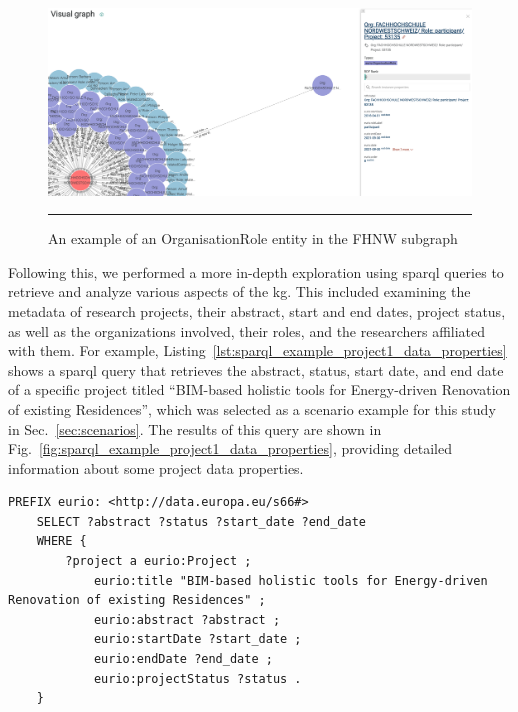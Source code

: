 \begin{figure}[htbp]
    \centering
 \includegraphics[width=.9\textwidth]{figures/architecture/graphdb-fhnw-organisationRole-example.png}
     \rule{35em}{0.5pt}
    \caption{An example of an OrganisationRole entity in the FHNW subgraph}
 \label{fig:fhnw-organisationRole-example}
\end{figure}

Following this, we performed a more in-depth exploration using \gls{sparql} queries to retrieve and analyze various aspects of the \gls{kg}.
This included examining the metadata of research projects, their abstract, start and end dates, project status, as well as the organizations involved, their roles, and the researchers affiliated with them.
For example, Listing~\ref{lst:sparql_example_project1_data_properties} shows a \gls{sparql} query that retrieves the abstract, status, start date, and end date of a specific project titled ``BIM-based holistic tools for Energy-driven Renovation of existing Residences'', which was selected as a scenario example for this study in Sec.~\ref{sec:scenarios}.
The results of this query are shown in Fig.~\ref{fig:sparql_example_project1_data_properties}, providing detailed information about some project data properties.

\begin{lstlisting}[language=SPARQL, caption={\gls{sparql} query for getting the abstract, status, start date, and end date of a project titled ``BIM-based holistic tools for Energy-driven Renovation of existing Residences''}, label=lst:sparql_example_project1_data_properties]
    PREFIX eurio: <http://data.europa.eu/s66#>
    SELECT ?abstract ?status ?start_date ?end_date
    WHERE {
        ?project a eurio:Project ; 
            eurio:title "BIM-based holistic tools for Energy-driven Renovation of existing Residences" ;
            eurio:abstract ?abstract ;
            eurio:startDate ?start_date ;
            eurio:endDate ?end_date ;
            eurio:projectStatus ?status .
    }
\end{lstlisting}

